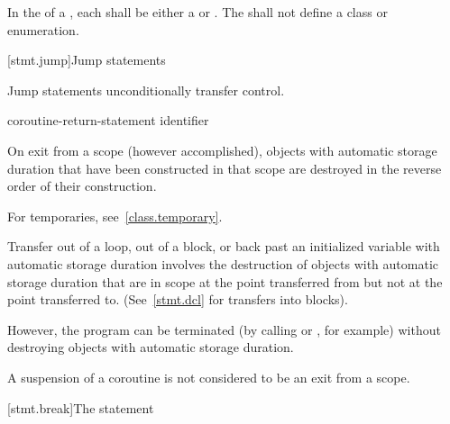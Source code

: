 \pnum
In the  of a ,
each  shall be either a 
or . The  shall not define a
class or enumeration.%

[stmt.jump]{Jump statements}%

\pnum
Jump statements unconditionally transfer control.
%

%
%
%
%
%
%
\begin{bnf}
\br
    \br
    \br
      \terminal{;}\br
    coroutine-return-statement\br
     identifier \terminal{;}
\end{bnf}

\pnum
{}%
%
On exit from a scope (however accomplished), objects with automatic storage
duration that have been constructed in that scope are destroyed
in the reverse order of their construction. \begin{note} For temporaries,
see~\ref{class.temporary}. \end{note} Transfer out of a loop, out of a block, or back
past
an initialized variable with automatic storage duration involves the
destruction of objects with automatic storage duration that are in
scope at the point transferred from but not at the point transferred to.
(See~\ref{stmt.dcl} for transfers into blocks).
\begin{note}
However, the program can be terminated (by calling
%
%
 or
%
%
, for example) without
destroying objects with automatic storage duration.
\end{note}
\begin{note}
A suspension of a coroutine is not considered to be an exit from a scope.
\end{note}

[stmt.break]{The  statement}%

